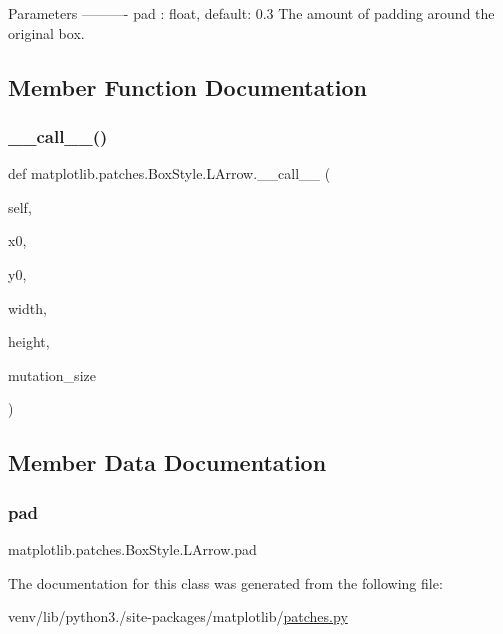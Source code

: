\begin{DoxyVerb}Parameters
----------
pad : float, default: 0.3
    The amount of padding around the original box.
\end{DoxyVerb}
 

\subsection{Member Function Documentation}
\mbox{\label{classmatplotlib_1_1patches_1_1BoxStyle_1_1LArrow_a0a13cc9641a873b1da4c4edff129314d}} 
\subsubsection{\texorpdfstring{\+\_\+\+\_\+call\+\_\+\+\_\+()}{\_\_call\_\_()}}
{\footnotesize\ttfamily def matplotlib.\+patches.\+Box\+Style.\+L\+Arrow.\+\_\+\+\_\+call\+\_\+\+\_\+ (\begin{DoxyParamCaption}\item[{}]{self,  }\item[{}]{x0,  }\item[{}]{y0,  }\item[{}]{width,  }\item[{}]{height,  }\item[{}]{mutation\+\_\+size }\end{DoxyParamCaption})}



\subsection{Member Data Documentation}
\mbox{\label{classmatplotlib_1_1patches_1_1BoxStyle_1_1LArrow_acfe58a098b509c818859f2ecd64309c8}} 
\subsubsection{\texorpdfstring{pad}{pad}}
{\footnotesize\ttfamily matplotlib.\+patches.\+Box\+Style.\+L\+Arrow.\+pad}



The documentation for this class was generated from the following file\+:\begin{DoxyCompactItemize}
\item 
venv/lib/python3./site-\/packages/matplotlib/\hyperlink{patches_8py}{patches.\+py}\end{DoxyCompactItemize}
